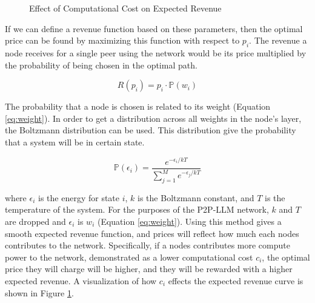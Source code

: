 \documentclass[preprint,twoside,11pt]{article}
\begin{document}
\begin{figure}
	\centering
	\caption{Effect of Computational Cost on Expected Revenue}
	\label{fig:exp_rev}
\end{figure}

If we can define a revenue function based on these parameters, then the optimal price can be found by maximizing this function with respect to $p_i$.
The revenue a node receives for a single peer using the network would be its price multiplied by the probability of being chosen in the optimal path.

\begin{equation}
	R(p_i) = p_i \cdot \mathbb{P}(w_i)
	\label{eq:revenue}
\end{equation}

The probability that a node is chosen is related to its weight (Equation \ref{eq:weight}).
In order to get a distribution across all weights in the node's layer, the Boltzmann distribution \citep{boltzmann1868studien} can be used.
This distribution give the probability that a system will be in certain state.

\begin{equation}
	\mathbb{P}(\epsilon_i) = \frac{e^{- \epsilon_i / kT}}{\sum_{j=1}^{M}e^{- \epsilon_j / kT}}
	\label{eq:Boltzmann}
\end{equation}

where $\epsilon_i$ is the energy for state $i$, $k$ is the Boltzmann constant, and $T$ is the temperature of the system.
For the purposes of the P2P-LLM network, $k$ and $T$ are dropped and $\epsilon_i$ is $w_i$ (Equation \ref{eq:weight}).
Using this method gives a smooth expected revenue function, and prices will reflect how much each nodes contributes to the network.
Specifically, if a nodes contributes more compute power to the network, demonstrated as a lower computational cost $c_i$, the optimal
price they will charge will be higher, and they will be rewarded with a higher expected revenue.
A visualization of how $c_i$ effects the expected revenue curve is shown in Figure \ref{fig:exp_rev}.
\end{document}
